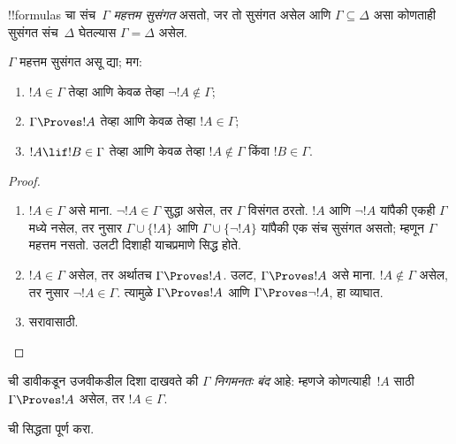 \documentclass[../../../include/open-logic-section]{subfiles}
\begin{document}


\begin{defn}
!!{formula}s चा संच~$\Gamma$ \emph{महत्तम सुसंगत} असतो, जर तो
सुसंगत असेल आणि $\Gamma \subseteq \Delta$ असा कोणताही सुसंगत
संच~$\Delta$ घेतल्यास $\Gamma = \Delta$ असेल.
\end{defn}

\begin{lem}[सत्यता पूर्वप्रमेय]
$\Gamma$ महत्तम सुसंगत असू द्या; मग:
\begin{enumerate}
\item {} $!A \in \Gamma$ तेव्हा आणि केवळ तेव्हा $\lnot !A
  \notin \Gamma$;
\item {} $\Gamma \Proves !A$ तेव्हा आणि केवळ तेव्हा $!A \in \Gamma$;
\item {} $!A \lif !B \in \Gamma$ तेव्हा आणि केवळ तेव्हा
  $!A \notin \Gamma$ किंवा $!B \in \Gamma$.
\end{enumerate}
\end{lem}

\begin{proof}
\begin{enumerate}
\item $!A \in \Gamma$ असे माना. $\lnot !A \in \Gamma$ सुद्धा असेल,
  तर $\Gamma$ विसंगत ठरतो. $!A$ आणि $\lnot!A$ यांपैकी एकही
  $\Gamma$ मध्ये नसेल, तर  नुसार
  $\Gamma\cup\{!A\}$ आणि $\Gamma \cup \{\lnot !A\}$ यांपैकी
  एक संच सुसंगत असतो; म्हणून $\Gamma$ महत्तम नसतो. उलटी दिशाही
  याचप्रमाणे सिद्ध होते.
\item $!A \in \Gamma$ असेल, तर अर्थातच $\Gamma \Proves !A$.
  उलट, $\Gamma \Proves !A$ असे माना. $!A \notin \Gamma$ असेल,
  तर  नुसार $\lnot !A \in \Gamma$. त्यामुळे
  $\Gamma \Proves !A$ आणि $\Gamma \Proves \lnot !A$, हा व्याघात.
\item सरावासाठी.
\end{enumerate}
\end{proof}

 ची डावीकडून उजवीकडील
दिशा दाखवते की $\Gamma$ \emph{निगमनतः बंद} आहे: म्हणजे
कोणत्याही~$!A$ साठी $\Gamma \Proves !A$ असेल, तर $!A
\in \Gamma$.

\begin{prob}
   ची सिद्धता पूर्ण करा.
\end{prob}
\end{document}
